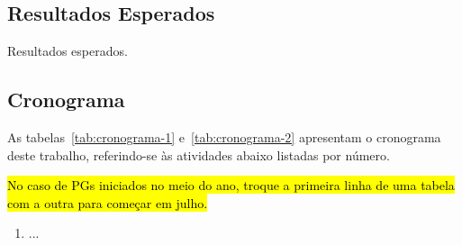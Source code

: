 \subsection{Resultados Esperados}
\label{sec-resultados-esperados}

Resultados esperados.



\subsection{Cronograma}
\label{sec-cronograma}

As tabelas~\ref{tab:cronograma-1} e~\ref{tab:cronograma-2} apresentam o cronograma deste trabalho, referindo-se às atividades abaixo listadas por número.

\hl{No caso de PGs iniciados no meio do ano, troque a primeira linha de uma tabela com a outra para começar em julho.}

\begin{enumerate}
	\item ...
\end{enumerate}

\begin{table}[htb]
	\centering
	\caption{Cronograma de Atividades do primeiro semestre.}
	\label{tab:cronograma-1}
\end{table}

